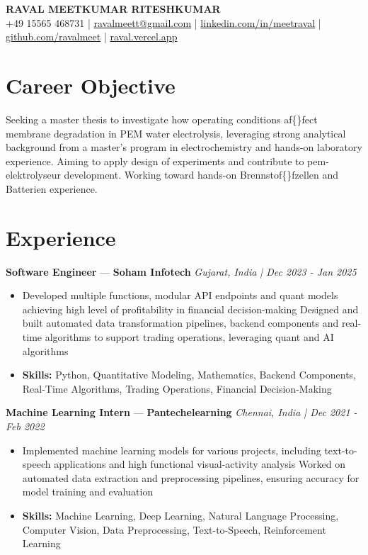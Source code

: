 \documentclass[a4paper,10pt]{article}
\begin{document}
\begin{center}
  {\Large\bfseries RAVAL MEETKUMAR RITESHKUMAR}\\[2pt]
  {\small +49 15565 468731 \;|\; \href{mailto:ravalmeett@gmail.com}{ravalmeett@gmail.com} \;|\; \href{https://www.linkedin.com/in/meetraval/}{linkedin.com/in/meetraval} \;|\; \href{https://github.com/ravalmeet}{github.com/ravalmeet} \;|\; \href{https://raval.vercel.app/}{raval.vercel.app}}
\end{center}
\vspace{-3pt}

\section*{Career Objective}
Seeking a master thesis to investigate how operating conditions af\{\}fect membrane degradation in PEM water electrolysis, leveraging strong analytical background from a master's program in electrochemistry and hands-on laboratory experience. Aiming to apply design of experiments and contribute to pem-elektrolyseur development. Working toward hands-on Brennstof\{\}fzellen and Batterien experience.\par

\section*{Experience}
\textbf{Software Engineer} — \textbf{Soham Infotech} \hfill \textit{Gujarat, India \;|\; Dec 2023 - Jan 2025}\par
\vspace{1pt}
\begin{itemize}
  \item Developed multiple functions, modular API endpoints and quant models achieving high level of profitability in financial decision-making Designed and built automated data transformation pipelines, backend components and real-time algorithms to support trading operations, leveraging quant and AI algorithms
  \item \textbf{Skills:} Python, Quantitative Modeling, Mathematics, Backend Components, Real-Time Algorithms, Trading Operations, Financial Decision-Making
\end{itemize}
\vspace{3pt}
\textbf{Machine Learning Intern} — \textbf{Pantechelearning} \hfill \textit{Chennai, India \;|\; Dec 2021 - Feb 2022}\par
\vspace{1pt}
\begin{itemize}
  \item Implemented machine learning models for various projects, including text-to-speech applications and high functional visual-activity analysis Worked on automated data extraction and preprocessing pipelines, ensuring accuracy for model training and evaluation
  \item \textbf{Skills:} Machine Learning, Deep Learning, Natural Language Processing, Computer Vision, Data Preprocessing, Text-to-Speech, Reinforcement Learning
\end{itemize}
\end{document}
